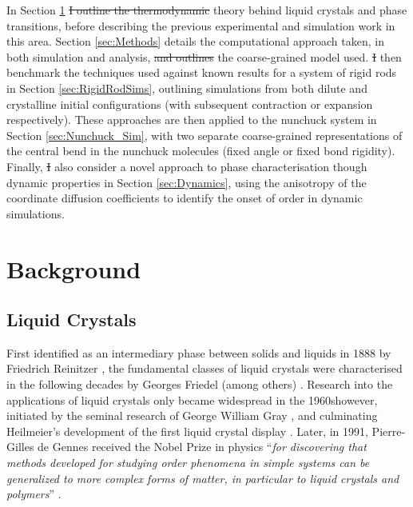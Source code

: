 \documentclass[11pt, a4paper]{article} %
\providecommand{\DIFadd}[1]{{\protect\color{blue}\uwave{#1}}} %
\providecommand{\DIFdel}[1]{{\protect\color{red}\sout{#1}}}                      %
\providecommand{\DIFaddbegin}{} %
\providecommand{\DIFaddend}{} %
\providecommand{\DIFdelbegin}{} %
\providecommand{\DIFdelend}{} %
\begin{document}
In Section \ref{sec:Background} \DIFdelbegin \DIFdel{I outline the thermodynamic }\DIFdelend \DIFaddbegin \DIFadd{\textcolor{forestgreen}{I} outline the \textcolor{forestgreen}{thermodynamic} }\DIFaddend theory behind liquid crystals and phase transitions, before describing the previous experimental and simulation work in this area. Section \ref{sec:Methods} details the computational approach taken, in both simulation and analysis, \DIFdelbegin \DIFdel{and outlines }\DIFdelend \DIFaddbegin \DIFadd{\textcolor{forestgreen}{and outlines} }\DIFaddend the coarse-grained model used. \DIFdelbegin \DIFdel{I }\DIFdelend \DIFaddbegin \DIFadd{We }\DIFaddend then benchmark the techniques used against known results for a system of rigid rods in Section \ref{sec:RigidRodSims}, outlining simulations from both dilute and crystalline initial configurations (with subsequent contraction or expansion respectively). These approaches are then applied to the nunchuck system in Section \ref{sec:Nunchuck_Sim}, with two separate coarse-grained representations of the central bend in the nunchuck molecules (fixed angle or fixed bond rigidity). Finally, \DIFdelbegin \DIFdel{I }\DIFdelend \DIFaddbegin \DIFadd{we }\DIFaddend also consider a novel approach to phase characterisation though dynamic properties in Section \ref{sec:Dynamics}, using the anisotropy of the coordinate diffusion coefficients to identify the onset of order in dynamic simulations.


\section{Background} \label{sec:Background}
\subsection{Liquid Crystals}

First identified as an intermediary phase between solids and liquids in 1888 by Friedrich Reinitzer \cite{Reinitzer1888}, the fundamental classes of liquid crystals were characterised in the following decades by Georges Friedel (among others) \cite{Friedel1922}. Research into the applications of liquid crystals only became widespread in the 1960s\DIFaddbegin \DIFadd{, }\DIFaddend however, initiated by the seminal research of George William Gray \cite{Gray1962}, and culminating Heilmeier's development of the first liquid crystal display \cite{Heilmeier1969, Heilmeier1968}. Later, in 1991, Pierre-Gilles de Gennes  received the Nobel Prize in physics ``\textit{for discovering that methods developed for studying order phenomena in simple systems can be generalized to more complex forms of matter, in particular to liquid crystals and polymers}'' \cite{DeGennes1992}.
\end{document}
